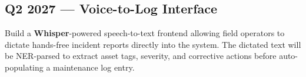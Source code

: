 \documentclass[12pt,a4paper]{article}
\begin{document}
\subsection{Q2 2027 --- Voice-to-Log Interface}

Build a \textbf{Whisper}-powered speech-to-text frontend allowing field operators to dictate hands-free incident reports directly into the system. The dictated text will be NER-parsed to extract asset tags, severity, and corrective actions before auto-populating a maintenance log entry.

\end{document}

